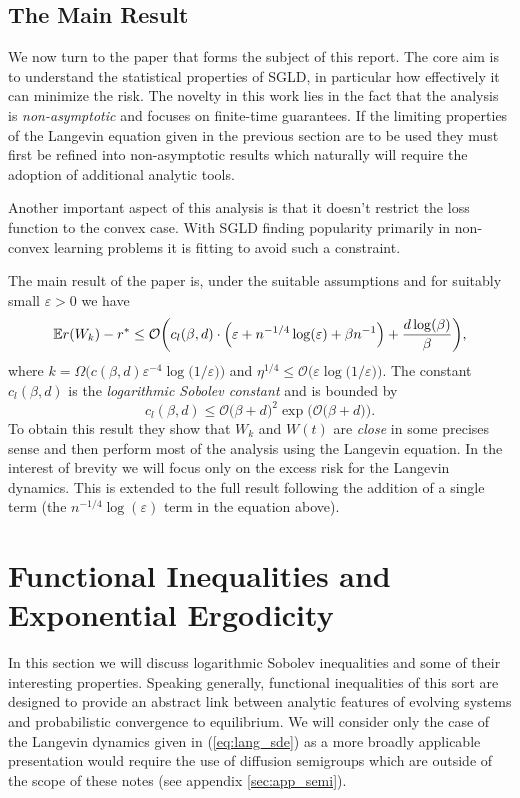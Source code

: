 \documentclass{article}
\newcommand{\Bcal}[1]{\mathcal{#1}}
\begin{document}
\subsection{The Main Result}
We now turn to the paper that forms the subject of this report. The core aim is to understand the statistical properties of SGLD, in particular how effectively it can minimize the risk. The novelty in this work lies in the fact that the analysis is \textit{non-asymptotic} and focuses on finite-time guarantees. If the limiting properties of the Langevin equation given in the previous section are to be used they must first be refined into non-asymptotic results which naturally will require the adoption of additional analytic tools.

Another important aspect of this analysis is that it doesn't restrict the loss function to the convex case. With SGLD finding popularity primarily in non-convex learning problems it is fitting to avoid such a constraint.

The main result of the paper\cite{Raginsky2017Non-ConvexAnalysis} is, under the suitable assumptions and for suitably small \(\varepsilon >0\) we have
\begin{equation}\label{eq:main_result}
    \Bbb{E} r(W_k) - r^* \leq \Bcal{O} \bigg ( c_l(\beta, d) \cdot \Big (\varepsilon + n^{-1/4}\log(\varepsilon) + \beta n^{-1} \Big ) + \frac{d\log(\beta)}{\beta}  \bigg ),
\end{equation}
where \(k = \Omega \big ( c(\beta, d) \varepsilon^{-4} \log \big ( 1/\varepsilon \big ) \big )\) and \(\eta^{1/4} \leq \Bcal{O} \big ( \varepsilon \log \big ( 1/\varepsilon \big ) \big )\). The constant \(c_l(\beta, d)\) is the \textit{logarithmic Sobolev constant} and is bounded by
\begin{equation*}
    c_l(\beta, d) \leq \Bcal{O} \big ( \beta + d \big )^2 \exp(\Bcal{O} \big ( \beta + d \big ) \big ).
\end{equation*}
To obtain this result they show that \(W_k\) and \(W(t)\) are \textit{close} in some precises sense and then perform most of the analysis using the Langevin equation. In the interest of brevity we will focus only on the excess risk for the Langevin dynamics. This is extended to the full result following the addition of a single term (the \(n^{-1/4}\log(\varepsilon)\) term in the equation above).

\section{Functional Inequalities and Exponential Ergodicity}
In this section we will discuss logarithmic Sobolev inequalities and some of their interesting properties. Speaking generally, functional inequalities of this sort are designed to provide an abstract link between analytic features of evolving systems and probabilistic convergence to equilibrium. We will consider only the case of the Langevin dynamics given in (\ref{eq:lang_sde}) as a more broadly applicable presentation would require the use of diffusion semigroups which are outside of the scope of these notes (see appendix \ref{sec:app_semi}).
\end{document}
